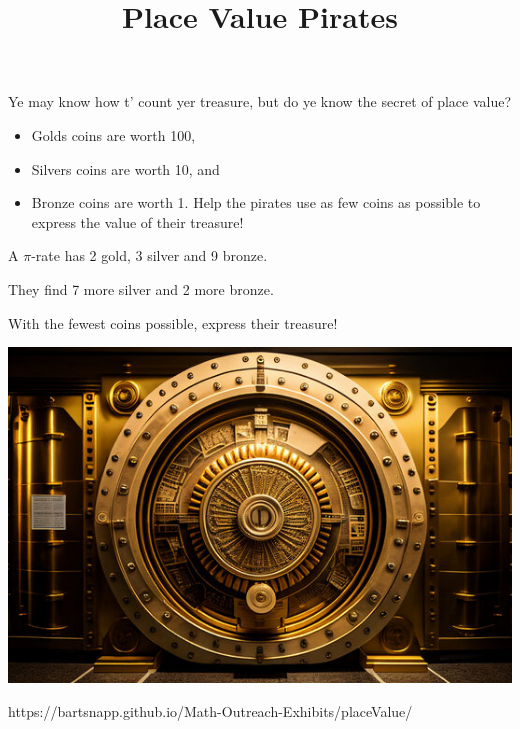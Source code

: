\documentclass{../exhibit}
\title{Place Value Pirates}
\begin{document}
\begin{context}
Ye may know how t' count yer treasure, but do ye know the secret of
place value?



\end{context}

\begin{directions}

\begin{itemize}
\item Golds coins are worth 100,
\item Silvers coins are worth 10, and
\item Bronze coins are worth 1.
Help the pirates use as few coins as possible to express the value of
their treasure!
\end{itemize}
\end{directions}

\begin{example}
  
  A $\pi$-rate has 2 gold, 3 silver and 9 bronze.

  They find 7 more silver and 2 more bronze.

  With the fewest coins possible, express their treasure!

  \begin{center}
    \includegraphics[width=.8\textwidth]{vault.jpg}
  \end{center}
\end{example}

\begin{mathConnections}
  https://bartsnapp.github.io/Math-Outreach-Exhibits/placeValue/
\end{mathConnections}
\end{document}
